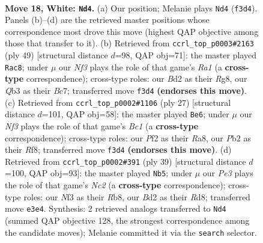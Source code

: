 \documentclass[11pt]{article}
\begin{document}
\clearpage

\begin{figure}[p]\centering
\begin{subfigure}{0.46\textwidth}\centering
\resizebox{\linewidth}{!}{%
\newchessgame
\chessboard[
  setfen={1rbrn1k1/p1p1qp2/2n3p1/2PpP2p/1p6/1Q2PNP1/PP1B1P1P/2K1RBR1 w - - 0 18},
  showmover=false,
  pgfstyle=straightmove, color=movearrow, markmove={f3-d4}
]}
\caption{}
\end{subfigure}\hfill
\begin{subfigure}{0.46\textwidth}\centering
\resizebox{\linewidth}{!}{%
\newchessgame
\chessboard[
  setfen={r5rk/2bbq1p1/1pp1pp1p/p2n3P/2NP1P2/P3P1N1/1PQ1BPR1/2R4K b - - 3 25},
  showmover=false,
  pgfstyle=straightmove, color=movearrow, markmove={a8-c8}
]}
\caption{}
\end{subfigure}
\\[4pt]
\begin{subfigure}{0.46\textwidth}\centering
\resizebox{\linewidth}{!}{%
\newchessgame
\chessboard[
  setfen={r1b2rk1/pp3pb1/1npq2pp/3p4/PP1P4/1QNBPN2/5PPP/R4RK1 b - - 0 14},
  showmover=false,
  pgfstyle=straightmove, color=movearrow, markmove={c8-e6}
]}
\caption{}
\end{subfigure}\hfill
\begin{subfigure}{0.46\textwidth}\centering
\resizebox{\linewidth}{!}{%
\newchessgame
\chessboard[
  setfen={1r1r3k/1bn1qppp/ppp2b2/3p4/QP1P2BP/2N1PNP1/P4P2/R3R1K1 b - - 1 20},
  showmover=false,
  pgfstyle=straightmove, color=movearrow, markmove={c7-b5}
]}
\caption{}
\end{subfigure}
\caption{\textbf{Move 18, White: \texttt{Nd4}.} (a) Our position; Melanie plays \texttt{Nd4} (\texttt{f3d4}). Panels (b)--(d) are the retrieved master positions whose correspondence most drove this move (highest QAP objective among those that transfer to it). (b) Retrieved from \texttt{ccrl\_top\_p0003\#2163} (ply 49) [structural distance $d$=98, QAP obj=71]: the master played \texttt{Rac8}; under $\mu$ our \emph{Nf3} plays the role of that game's \emph{Ra1} (a \textbf{cross-type} correspondence); cross-type roles: our \emph{B}d2 as their \emph{R}g8, our \emph{Q}b3 as their \emph{B}c7; transferred move \texttt{f3d4} \textbf{(endorses this move)}. (c) Retrieved from \texttt{ccrl\_top\_p0002\#1106} (ply 27) [structural distance $d$=101, QAP obj=58]: the master played \texttt{Be6}; under $\mu$ our \emph{Nf3} plays the role of that game's \emph{Bc1} (a \textbf{cross-type} correspondence); cross-type roles: our \emph{P}f2 as their \emph{R}a8, our \emph{P}b2 as their \emph{R}f8; transferred move \texttt{f3d4} \textbf{(endorses this move)}. (d) Retrieved from \texttt{ccrl\_top\_p0002\#391} (ply 39) [structural distance $d$=100, QAP obj=93]: the master played \texttt{Nb5}; under $\mu$ our \emph{Pe3} plays the role of that game's \emph{Nc2} (a \textbf{cross-type} correspondence); cross-type roles: our \emph{N}f3 as their \emph{R}b8, our \emph{B}d2 as their \emph{R}d8; transferred move \texttt{e3e4}. Synthesis: 2 retrieved analogs transferred to \texttt{Nd4} (summed QAP objective 128, the strongest correspondence among the candidate moves); Melanie committed it via the \texttt{search} selector.}
\label{fig:thought-m34}
\end{figure}
\end{document}

